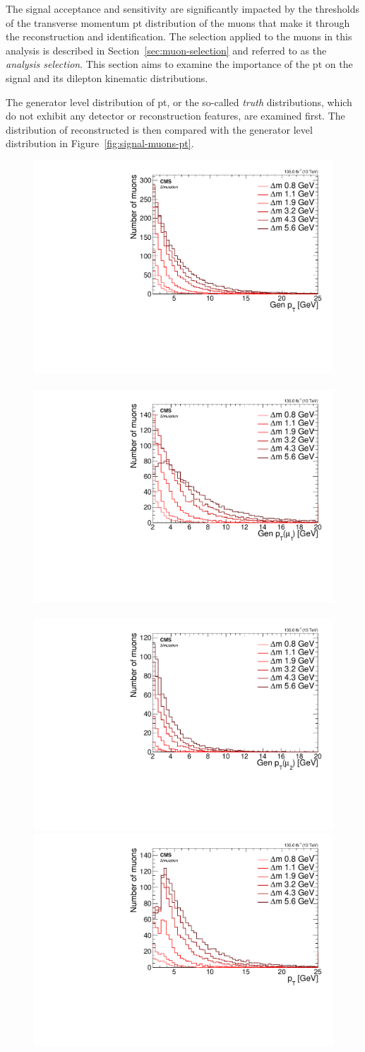 The signal acceptance and sensitivity are significantly impacted by the thresholds of the transverse momentum \gls{pt} distribution of the muons that make it through the reconstruction and identification. The selection applied to the muons in this analysis is described in Section~\ref{sec:muon-selection} and referred to as the \emph{analysis selection}. This section aims to examine the importance of the \gls{pt} on the signal and its dilepton kinematic distributions.

The generator level distribution of \gls{pt}, or the so-called \emph{truth} distributions, which do not exhibit any detector or reconstruction features, are examined first. The distribution of reconstructed \pt is then compared with the generator level distribution in Figure~\ref{fig:signal-muons-pt}. 

\begin{figure}[!htb]
\centering
\includegraphics[width=0.32\linewidth]{plots/signal_muons_gen/none_Muons_pt.pdf} \,
\includegraphics[width=0.32\linewidth]{plots/signal_muons_gen/none_Muons_m1_pt.pdf}  \,
\includegraphics[width=0.32\linewidth]{plots/signal_muons_gen/none_Muons_m2_pt.pdf} \\
\includegraphics[width=0.32\linewidth]{plots/signal_muons/none_Muons_pt.pdf} \,

\end{figure}
